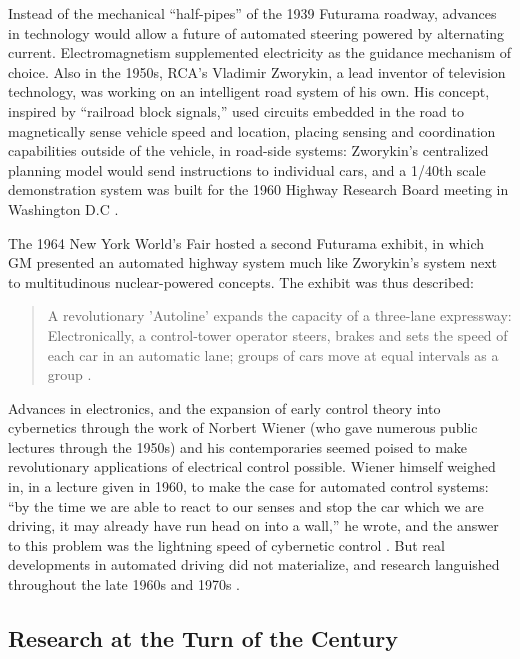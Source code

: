Instead of the mechanical ``half-pipes'' of the 1939 Futurama roadway, advances in
technology would allow a future of automated steering powered
by alternating current. Electromagnetism supplemented electricity as the
guidance mechanism of choice. Also in the 1950s, RCA's
Vladimir Zworykin, a lead inventor of television technology, was
working on an intelligent road system of his own. His concept,
inspired by ``railroad block signals,'' used circuits embedded in the
road to magnetically sense vehicle speed and location, placing sensing
and coordination capabilities outside of the vehicle, in road-side
systems:  Zworykin's centralized planning model would send
instructions to individual cars, and a 1/40th scale demonstration
system was built for the 1960 Highway Research Board meeting in
Washington D.C \cite[p. 9]{wetmore}.

The 1964 New York World's Fair hosted a second Futurama exhibit, in
which GM presented an automated highway system much like Zworykin's
system next to multitudinous nuclear-powered concepts. The exhibit was
thus described: 
\begin{quote}A revolutionary 'Autoline' expands the capacity of a three-lane
expressway: Electronically, a control-tower operator steers, brakes
and sets the speed of each car in an automatic lane; groups of cars
move at equal intervals as a group \cite[p. 9]{wetmore}.\end{quote}
 Advances in
electronics, and the expansion of early control theory into
cybernetics through the work of Norbert Wiener (who gave numerous
public lectures through the 1950s) and his contemporaries seemed
poised to make revolutionary applications of electrical control
possible. Wiener himself weighed in, in a lecture given in 1960, to
make the case for automated control systems: ``by the time we are able
to react to our senses and stop the car which we are driving, it may
already have run head on into a wall,'' he wrote, and the answer to
this problem was the lightning speed of cybernetic control \cite{wienerOn}. But real
developments in automated driving did not materialize, and research
languished throughout the late 1960s and 1970s \cite[p. 10]{wetmore}.

\subsection{Research at the Turn of the Century}


